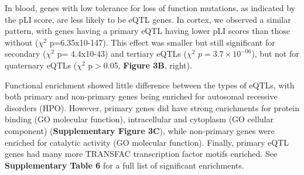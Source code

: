 {{In blood, genes with low tolerance for loss of function mutations, as indicated by the pLI score, are less likely to be eQTL genes\cite{vosaUnravelingPolygenicArchitecture2018}. In cortex, we observed a similar pattern, with genes having a primary eQTL having lower pLI scores than those without ($\chi^2$ p=6.35x10-147). This effect was smaller but still significant for secondary ($\chi^2$ p= 4.4x10-43) and tertiary eQTLs ($\chi^2$ $p = 3.7 \times 10^{-06}$), but not for quaternary eQTLs ($\chi^2$ p$>$0.05, \textbf{Figure 3B}, right). 

Functional enrichment showed little difference between the types of eQTLs, with both primary and non-primary genes being enriched for autosomal recessive disorders (HPO). However, primary genes did have strong enrichments for protein binding (GO molecular function), intracellular and cytoplasm (GO cellular component) (\textbf{Supplementary Figure 3C}), while non-primary genes were enriched for catalytic activity (GO molecular function). Finally, primary eQTL genes had many more TRANSFAC\cite{wingenderTRANSFACDatabaseTranscription1996} transcription factor motifs enriched. See \textbf{Supplementary Table 6} for a full list of significant enrichments.    

}}
